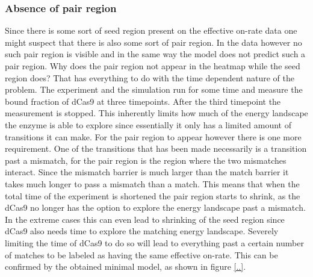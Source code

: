 \subsubsection{Absence of pair region}
Since there is some sort of seed region present on the effective on-rate data one might suspect that there is also some sort of pair region. In the data however no such pair region is visible and in the same way the model does not predict such a pair region. Why does the pair region not appear in the heatmap while the seed region does? That has everything to do with the time dependent nature of the problem. The experiment and the simulation run for some time and measure the bound fraction of dCas9 at three timepoints. After the third timepoint the measurement is stopped. This inherently limits how much of the energy landscape the enzyme is able to explore since essentially it only has a limited amount of transitions it can make. For the pair region to appear however there is one more requirement. One of the transitions that has been made necessarily is a transition past a mismatch, for the pair region is the region where the two mismatches interact. Since the mismatch barrier is much larger than the match barrier it takes much longer to pass a mismatch than a match. This means that when the total time of the experiment is shortened the pair region starts to shrink, as the dCas9 no longer has the option to explore the energy landscape past a mismatch. In the extreme cases this can even lead to shrinking of the seed region since dCas9 also needs time to explore the matching energy landscape. Severely limiting the time of dCas9 to do so will lead to everything past a certain number of matches to be labeled as having the same effective on-rate. This can be confirmed by the obtained minimal model, as shown in figure \ref{..}.

